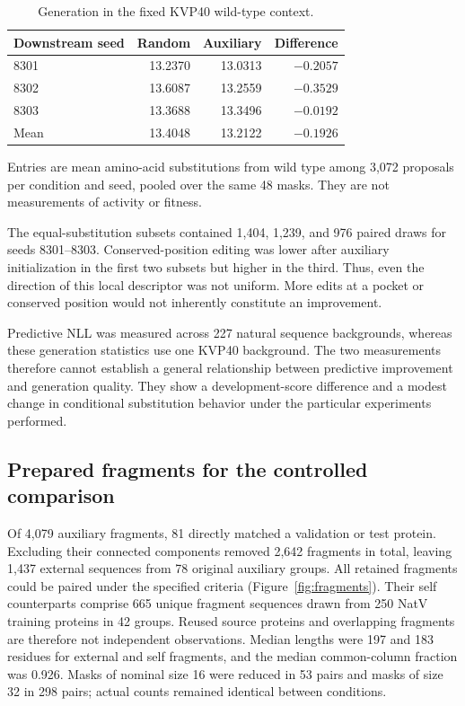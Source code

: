 \documentclass[referee,pdflatex,sn-vancouver-num]{sn-jnl}
\begin{document}
\begin{table}[htbp]
\caption{Generation in the fixed KVP40 wild-type context.}\label{tab:generation}
\centering
\begin{tabular}{lrrr}
\toprule
Downstream seed & Random & Auxiliary & Difference \\
\midrule
8301 & 13.2370 & 13.0313 & $-0.2057$ \\
8302 & 13.6087 & 13.2559 & $-0.3529$ \\
8303 & 13.3688 & 13.3496 & $-0.0192$ \\
Mean & 13.4048 & 13.2122 & $-0.1926$ \\
\bottomrule
\end{tabular}
\par\smallskip\small Entries are mean amino-acid substitutions from wild type among 3,072 proposals per condition and seed, pooled over the same 48 masks. They are not measurements of activity or fitness.
\end{table}

The equal-substitution subsets contained 1,404, 1,239, and 976 paired draws for seeds 8301--8303. Conserved-position editing was lower after auxiliary initialization in the first two subsets but higher in the third. Thus, even the direction of this local descriptor was not uniform. More edits at a pocket or conserved position would not inherently constitute an improvement.

Predictive NLL was measured across 227 natural sequence backgrounds, whereas these generation statistics use one KVP40 background. The two measurements therefore cannot establish a general relationship between predictive improvement and generation quality. They show a development-score difference and a modest change in conditional substitution behavior under the particular experiments performed.

\subsection{Prepared fragments for the controlled comparison}
Of 4,079 auxiliary fragments, 81 directly matched a validation or test protein. Excluding their connected components removed 2,642 fragments in total, leaving 1,437 external sequences from 78 original auxiliary groups. All retained fragments could be paired under the specified criteria (Figure~\ref{fig:fragments}). Their self counterparts comprise 665 unique fragment sequences drawn from 250 NatV training proteins in 42 groups. Reused source proteins and overlapping fragments are therefore not independent observations. Median lengths were 197 and 183 residues for external and self fragments, and the median common-column fraction was 0.926. Masks of nominal size 16 were reduced in 53 pairs and masks of size 32 in 298 pairs; actual counts remained identical between conditions.
\end{document}
